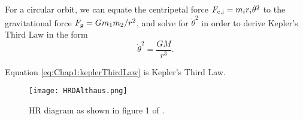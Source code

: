 For a circular orbit, we can equate the centripetal force $F_{\rm c,i}= m_ir_i\dot{\theta}^2$ to the gravitational force $F_{\rm g}=Gm_1m_2/r^2$, and solve for $\dot{\theta}^2$ in order to derive Kepler's Third Law in the form
\begin{equation}\label{eq:Chap1:keplerThirdLaw}
	\dot{\theta}^2 = \dfrac{G M}{r^3}.
\end{equation}

Equation \ref{eq:Chap1:keplerThirdLaw} is Kepler's Third Law.

\begin{figure}
	\texttt{[image: HRDAlthaus.png]}
\caption[HR Diagram]{
\ac{HR} diagram as shown in figure 1 of \citet{Althaus2010}.
}
		\label{fig:Chap1:HRDAlthaus}
\end{figure}


